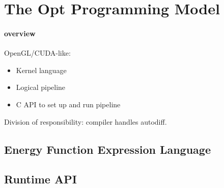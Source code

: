 \section{The Opt Programming Model}
\label{sec:language}


\paragraph{overview} 
OpenGL/CUDA-like:
\begin{itemize}
  \item Kernel language
  \item Logical pipeline
  \item C API to set up and run pipeline
\end{itemize}

Division of responsibility: compiler handles autodiff.

\subsection{Energy Function Expression Language} %
\label{sub:expression_language}


\subsection{Runtime API} %
\label{sub:runtime_api}

